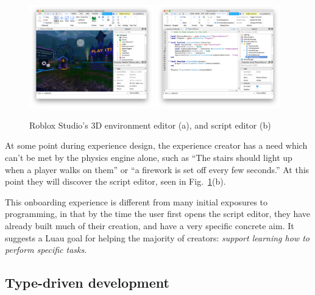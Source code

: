 \documentclass[acmsmall]{acmart}
\begin{document}
\begin{figure}
\includegraphics[width=0.48\textwidth]{studio-mow.png}
\includegraphics[width=0.48\textwidth]{studio-script-editor.png}
\caption{Roblox Studio's 3D environment editor (a), and script editor (b)}
\label{fig:studio}
\end{figure}

At some point during experience design, the experience creator has a need
which can't be met by the physics engine alone, such as ``The stairs should
light up when a player walks on them'' or ``a firework is set off
every few seconds.'' At this point they will discover the script
editor, seen in Fig.~\ref{fig:studio}(b).

This onboarding experience is different from many initial exposures to
programming, in that by the time the user first opens the script
editor, they have already built much of their creation, and have a
very specific concrete aim.  It suggests a Luau goal for helping the
majority of creators: \emph{support learning how to perform specific
tasks}.

\subsection{Type-driven development}
\end{document}
